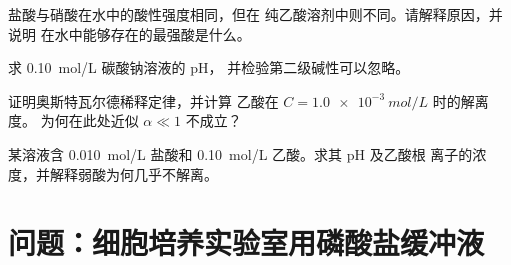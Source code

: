 \begin{exercise}[$\star\star$]\label{exo:b1:predominant-reaction:9}
盐酸与硝酸在水中的酸性强度相同，但在
纯乙酸溶剂中则不同。请解释原因，并说明
在水中能够存在的最强酸是什么。
\end{exercise}

\begin{exercise}[$\star\star\star$]\label{exo:b1:predominant-reaction:10}
求 \qty{0.10}{mol/L} 碳酸钠溶液的 pH，
并检验第二级碱性可以忽略。
\end{exercise}

\begin{exercise}[$\star\star\star$]\label{exo:b1:predominant-reaction:11}
证明奥斯特瓦尔德稀释定律，并计算
乙酸在 $C = \qty{1.0e-3}{mol/L}$ 时的解离度。
为何在此处近似 $\alpha \ll 1$ 不成立？
\end{exercise}

\begin{exercise}[$\star\star\star$]\label{exo:b1:predominant-reaction:12}
某溶液含 \qty{0.010}{mol/L} 盐酸和
\qty{0.10}{mol/L} 乙酸。求其 pH 及乙酸根
离子的浓度，并解释弱酸为何几乎不解离。
\end{exercise}

\section{问题：细胞培养实验室用磷酸盐缓冲液}

